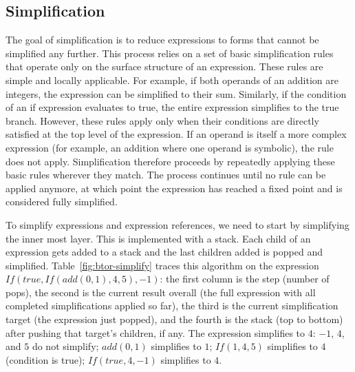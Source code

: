 \documentclass[11pt]{article}
\begin{document}
\subsection{Simplification}

The goal of simplification is to reduce expressions to forms that cannot be simplified any further. This process relies on a set of basic simplification rules that operate only on the surface structure of an expression. These rules are simple and locally applicable. For example, if both operands of an addition are integers, the expression can be simplified to their sum. Similarly, if the condition of an if expression evaluates to true, the entire expression simplifies to the true branch. However, these rules apply only when their conditions are directly satisfied at the top level of the expression. If an operand is itself a more complex expression (for example, an addition where one operand is symbolic), the rule does not apply. Simplification therefore proceeds by repeatedly applying these basic rules wherever they match. The process continues until no rule can be applied anymore, at which point the expression has reached a fixed point and is considered fully simplified.

To simplify expressions and expression references, we need to start by simplifying the inner most layer. This is implemented with a stack. Each child of an expression gets added to a stack and the last children added is popped and simplified. Table~\ref{fig:btor-simplify} traces this algorithm on the expression $\mathit{If}(\mathit{true}, \mathit{If}(\mathit{add}(0,1), 4, 5), -1)$: the first column is the step (number of pops), the second is the current result overall (the full expression with all completed simplifications applied so far), the third is the current simplification target (the expression just popped), and the fourth is the stack (top to bottom) after pushing that target's children, if any. The expression simplifies to $4$: $-1$, $4$, and $5$ do not simplify; $\mathit{add}(0,1)$ simplifies to $1$; $\mathit{If}(1, 4, 5)$ simplifies to $4$ (condition is true); $\mathit{If}(\mathit{true}, 4, -1)$ simplifies to $4$.
\end{document}
